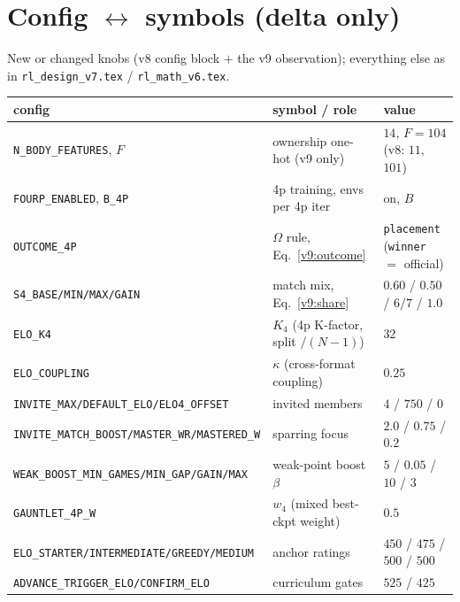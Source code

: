 \documentclass[11pt]{article}
\newcommand{\cd}[1]{\texttt{#1}}
\begin{document}
\section{Config $\leftrightarrow$ symbols (delta only)}\label{v9:cfg}
New or changed knobs (v8 config block $+$ the v9 observation); everything else as in
\texttt{rl\_design\_v7.tex} / \texttt{rl\_math\_v6.tex}.
\begin{center}\small
\begin{tabular}{@{}lll@{}}
\toprule
config & symbol / role & value \\
\midrule
\cd{N\_BODY\_FEATURES}, $F$  & ownership one-hot (v9 only)            & $14$, $F{=}104$ (v8: $11$, $101$)\\
\cd{FOURP\_ENABLED}, \cd{B\_4P} & 4p training, envs per 4p iter       & on, $B$\\
\cd{OUTCOME\_4P}             & $\Omega$ rule, Eq.~\eqref{v9:outcome}  & \cd{placement} (\cd{winner} $=$ official)\\
\cd{S4\_BASE/MIN/MAX/GAIN}   & match mix, Eq.~\eqref{v9:share}        & $0.60$ / $0.50$ / $6/7$ / $1.0$\\
\cd{ELO\_K4}                 & $K_4$ (4p K-factor, split $/(N{-}1)$)  & $32$\\
\cd{ELO\_COUPLING}           & $\kappa$ (cross-format coupling)       & $0.25$\\
\cd{INVITE\_MAX/DEFAULT\_ELO/ELO4\_OFFSET} & invited members          & $4$ / $750$ / $0$\\
\cd{INVITE\_MATCH\_BOOST/MASTER\_WR/MASTERED\_W} & sparring focus     & $2.0$ / $0.75$ / $0.2$\\
\cd{WEAK\_BOOST\_MIN\_GAMES/MIN\_GAP/GAIN/MAX} & weak-point boost $\beta$ & $5$ / $0.05$ / $10$ / $3$\\
\cd{GAUNTLET\_4P\_W}         & $w_4$ (mixed best-ckpt weight)         & $0.5$\\
\cd{ELO\_STARTER/INTERMEDIATE/GREEDY/MEDIUM} & anchor ratings         & $450$ / $475$ / $500$ / $500$\\
\cd{ADVANCE\_TRIGGER\_ELO/CONFIRM\_ELO} & curriculum gates            & $525$ / $425$\\
\bottomrule
\end{tabular}
\end{center}
\end{document}
